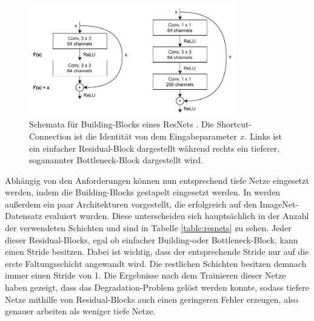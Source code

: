 \begin{figure}
    \centering
    \includegraphics[width=0.8\textwidth]{images/resnet_building_block.pdf}
    \caption{Schemata für Building-Blocks eines ResNets \cite{he2015deep}. Die
    Shortcut-Connection ist die Identität von dem Eingabeparameter $x$. Links ist ein einfacher Residual-Block dargestellt während rechts ein tieferer, soganannter Bottleneck-Block dargestellt wird.}
    \label{fig:resnet-building-block}
\end{figure}

Abhängig von den Anforderungen können nun entsprechend tiefe Netze eingesetzt
werden, indem die Building-Blocks gestapelt eingesetzt werden. In
\cite{he2015deep} werden außerdem ein paar Architekturen vorgestellt, die
erfolgreich auf den ImageNet-Datensatz \cite{deng2009imagenet} evaluiert wurden.
Diese unterscheiden sich hauptsächlich in der Anzahl der verwendeten Schichten
und sind in Tabelle \ref{table:resnets} zu sehen. Jeder dieser Residual-Blocks,
egal ob einfacher Building-oder Bottleneck-Block, kann einen Stride besitzen.
Dabei ist wichtig, dass der entsprechende Stride nur auf die erste
Faltungsschicht angewandt wird. Die restlichen Schichten besitzen demnach immer
einen Stride von 1. Die Ergebnisse nach dem Trainieren dieser Netze haben
gezeigt, dass das Degradation-Problem gelöst werden konnte, sodass tiefere Netze
mithilfe von Residual-Blocks auch einen geringeren Fehler erzeugen, also genauer
arbeiten als weniger tiefe Netze.

